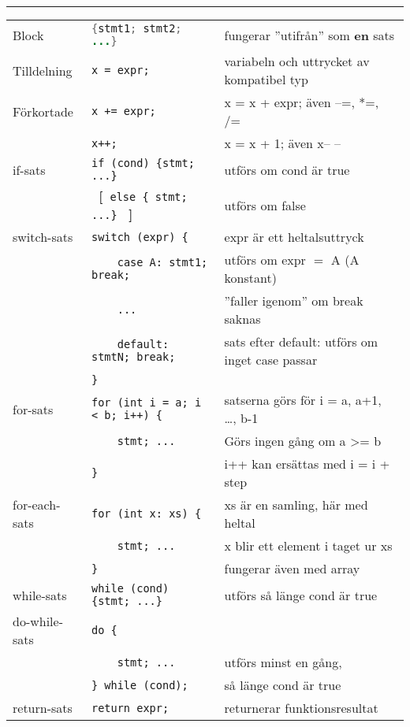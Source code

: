 \documentclass[article, a5paper]{memoir}
\newcommand{\OptL}{\textbf{\textcolor{grammarcolor}{~[~}}}
\newcommand{\OptR}{\textbf{\textcolor{grammarcolor}{~]~}}}
\newcommand{\LangColor}{red}
\newcommand{\head}[1]{{\bfseries {\color{\LangColor}{#1}}\par\vspace{1mm}\hrule\vspace{-2mm}}}
\newcommand{\secend}{\\[1mm]}
\newcommand{\jcode}{\lstinline[basicstyle=\ttfamily,language=Java]}
\newcommand{\Newline}{\vspace{\baselineskip}}
\begin{document}
\Newline
\head{Satser}\Newline
{\small
\begin{tabular}{@{}l l l}
Block   & \jcode|{stmt1; stmt2; ...}| &  fungerar ''utifrån'' som \textbf{en} sats \secend

Tilldelning & \verb|x = expr;|                 &  variabeln och uttrycket av kompatibel typ \secend

Förkortade       & \verb|x += expr; |                &  x = x + expr; även --=, *=, /= \\
                 & \verb|x++;  |                     &  x = x + 1; även x\hspace{0.5mm}-- -- \secend

if-sats          & \verb|if (cond) {stmt; ...}|      &  utförs om cond är true \\
                 & \OptL \verb|else { stmt; ...}| \OptR&  utförs om false \secend

switch-sats      & \verb|switch (expr) {|         &  expr är ett heltalsuttryck \\ 
                 & \verb|    case A: stmt1; break;|  &  utförs om expr $=$ A (A konstant) \\
                 & \verb|    ...|                 & ''faller igenom'' om break saknas\\
                 & \verb|    default: stmtN; break;| &  sats efter default: utförs om inget case passar\\
                 & \verb|}|                   & \secend

for-sats         & \verb|for (int i = a; i < b; i++) {| & satserna görs för i = a, a+1, \ldots, b-1\\
                 & \verb|    stmt; ...|  & Görs ingen gång om a >= b \\
                 & \verb|}  |         &  i++ kan ersättas med i = i + step \secend

for-each-sats    & \verb|for (int x: xs) {|   & xs är en samling, här med heltal  \secend
                 & \verb|    stmt; ...|  & x blir ett element i taget ur xs\\
                 & \verb|}  |         &  fungerar även med array \secend

while-sats       & \verb|while (cond) {stmt; ...}|          & utförs så länge cond är true \secend

do-while-sats    & \verb|do {|                     & \\
                 & \verb|    stmt; ...|         &  utförs minst en gång, \\
                 & \verb|} while (cond);|          &  så länge cond är true \secend

return-sats      & \verb|return expr;|        &  returnerar funktionsresultat
\end{tabular}
}
\end{document}
